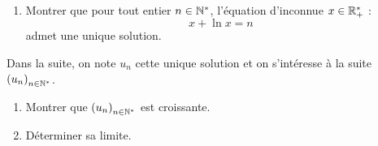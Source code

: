 \begin{corr}
\end{corr}

\begin{exo}
\begin{enumerate}[series=ex14suites]
\item Montrer que pour tout entier \(n\in\mathbb{N}^*\), l'équation d'inconnue \(x\in\mathbb{R}_+^*\) : \[x+\ln x=n\] admet une unique solution.
\end{enumerate}

Dans la suite, on note \(u_n\) cette unique solution et on s'intéresse à la suite \(\left(u_n\right)_{n\in\mathbb{N}^*}\).

\begin{enumerate}[resume=ex14suites]
\item Montrer que \(\left(u_n\right)_{n\in\mathbb{N}^*}\) est croissante. \\

\item Déterminer sa limite.
\end{enumerate}
\end{exo}

\begin{corr}
\end{corr}